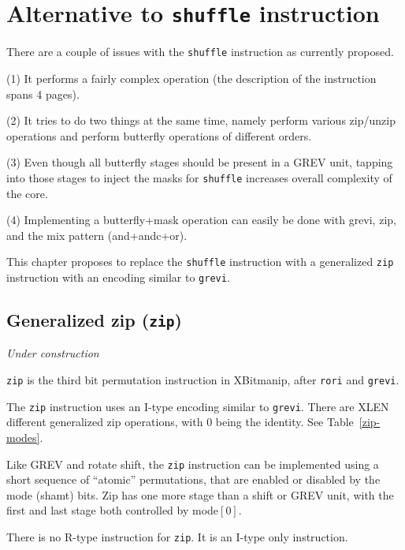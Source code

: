 \chapter{Alternative to \texttt{shuffle} instruction}

There are a couple of issues with the {\tt shuffle} instruction as currently proposed.

(1) It performs a fairly complex operation (the description of the instruction
spans 4 pages).

(2) It tries to do two things at the same time, namely perform various zip/unzip
operations and perform butterfly operations of different orders.

(3) Even though all butterfly stages should be present in a GREV unit, tapping into
those stages to inject the masks for {\tt shuffle} increases overall complexity of
the core.

(4) Implementing a butterfly+mask operation can easily be done with grevi, zip,
and the mix pattern (and+andc+or).

This chapter proposes to replace the {\tt shuffle} instruction with a generalized
{\tt zip} instruction with an encoding similar to {\tt grevi}.


\section{Generalized zip (\texttt{zip})}

{\it Under construction}

{\tt zip} is the third bit permutation instruction in XBitmanip, after {\tt rori}
and {\tt grevi}.

The {\tt zip} instruction uses an I-type encoding similar to {\tt grevi}. There
are XLEN different generalized zip operations, with 0 being the identity. See
Table~\ref{zip-modes}.

Like GREV and rotate shift, the {\tt zip} instruction can be implemented using a short
sequence of ``atomic'' permutations, that are enabled or disabled by the mode (shamt)
bits. Zip has one more stage than a shift or GREV unit, with the first and last stage
both controlled by mode$[0]$.

There is no R-type instruction for {\tt zip}. It is an I-type only instruction.

